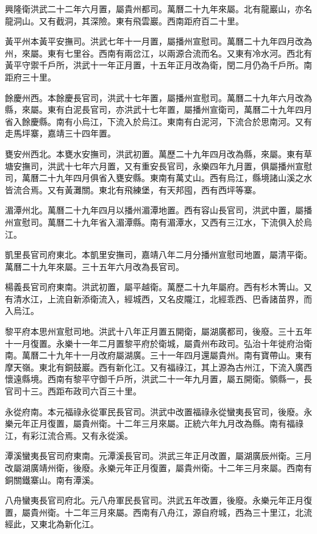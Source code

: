 興隆衛洪武二十二年六月置，屬貴州都司。萬曆二十九年來屬。北有龍巖山，亦名龍洞山。又有截洞，其深險。東有飛雲巖。西南距府百二十里。

黃平州本黃平安撫司。洪武七年十一月置，屬播州宣慰司。萬曆二十九年四月改為州，來屬。東有七里谷。西南有兩岔江，以兩源合流而名。又東有冷水河。西北有黃平守禦千戶所，洪武十一年正月置，十五年正月改為衛，閏二月仍為千戶所。南距府三十里。

餘慶州西。本餘慶長官司，洪武十七年置，屬播州宣慰司。萬曆二十九年六月改為縣，來屬。東有白泥長官司，亦洪武十七年置，屬播州宣衛司，萬曆二十九年四月省入餘慶縣。南有小烏江，下流入於烏江。東南有白泥河，下流合於思南河。又有走馬坪寨，嘉靖三十四年置。

甕安州西北。本甕水安撫司，洪武初置。萬歷二十九年四月改為縣，來屬。東有草塘安撫司，洪武十七年六月置，又有重安長官司，永樂四年九月置，俱屬播州宣慰司，萬曆二十九年四月俱省入甕安縣。東南有萬丈山。西有烏江，縣境諸山溪之水皆流合焉。又有黃灘關。東北有飛練堡，有天邦囤，西有西坪等寨。

湄潭州北。萬曆二十九年四月以播州湄潭地置。西有容山長官司，洪武中置，屬播州宣慰司。萬曆二十九年省入湄潭縣。南有湄潭水，又西有三江水，下流俱入於烏江。

凱里長官司府東北。本凱里安撫司，嘉靖八年二月分播州宣慰司地置，屬清平衛。萬曆二十九年來屬。三十五年六月改為長官司。

楊義長官司府東南。洪武初置，屬平越衛。萬歷二十九年屬府。西有杉木箐山。又有清水江，上流自新添衛流入，經城西，又名皮隴江，北經乖西、巴香諸苗界，而入烏江。

黎平府本思州宣慰司地。洪武十八年正月置五開衛，屬湖廣都司，後廢。三十五年十一月復置。永樂十一年二月置黎平府於衛城，屬貴州布政司。弘治十年徙府治衛南。萬曆二十九年十一月改府屬湖廣。三十一年四月還屬貴州。南有寶帶山。東有摩天嶺。東北有銅鼓巖。西有新化江。又有福祿江，其上源為古州江，下流入廣西懷遠縣境。西南有黎平守御千戶所，洪武二十一年九月置，屬五開衛。領縣一，長官司十三。西距布政司六百三十里。

永從府南。本元福祿永從軍民長官司。洪武中改置福祿永從蠻夷長官司，後廢。永樂元年正月復置，屬貴州衛。十二年三月來屬。正統六年九月改為縣。南有福祿江，有彩江流合焉。又有永從溪。

潭溪蠻夷長官司府東南。元潭溪長官司。洪武三年正月改置，屬湖廣辰州衛。三月改屬湖廣靖州衛，後廢。永樂元年正月復置，屬貴州衛。十二年三月來屬。西南有銅關鐵寨山。南有潭溪。

八舟蠻夷長官司府北。元八舟軍民長官司。洪武五年改置，後廢。永樂元年正月復置，屬貴州衛。十二年三月來屬。西南有八舟江，源自府城，西為三十里江，北流經此，又東北為新化江。

